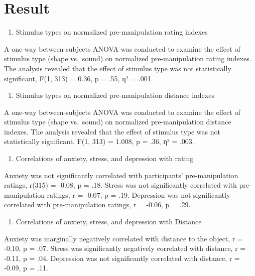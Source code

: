 \documentclass[
  letterpaper,
  DIV=11,
  numbers=noendperiod]{scrartcl}
\providecommand{\tightlist}{%
  \setlength{\itemsep}{0pt}\setlength{\parskip}{0pt}}\usepackage{longtable,booktabs,array}
\begin{document}
\section{Result}\label{result}

\begin{enumerate}
\def\labelenumi{\arabic{enumi}.}
\tightlist
\item
  Stimulus types on normalized pre-manipulation rating indexes
\end{enumerate}

A one-way between-subjects ANOVA was conducted to examine the effect of
stimulus type (shape vs.~sound) on normalized pre-manipulation rating
indexes. The analysis revealed that the effect of stimulus type was not
statistically significant, F(1, 313) = 0.36, p = .55, η² = .001.

\begin{enumerate}
\def\labelenumi{\arabic{enumi}.}
\setcounter{enumi}{1}
\tightlist
\item
  Stimulus types on normalized pre-manipulation distance indexes
\end{enumerate}

A one-way between-subjects ANOVA was conducted to examine the effect of
stimulus type (shape vs.~sound) on normalized pre-manipulation distance
indexes. The analysis revealed that the effect of stimulus type was not
statistically significant, F(1, 313) = 1.008, p = .36, η² = .003.

\begin{enumerate}
\def\labelenumi{\arabic{enumi}.}
\setcounter{enumi}{2}
\tightlist
\item
  Correlations of anxiety, stress, and depression with rating
\end{enumerate}

Anxiety was not significantly correlated with participants'
pre-manipulation ratings, r(315) = -0.08, p = .18. Stress was not
significantly correlated with pre-manipulation ratings, r = -0.07, p =
.19. Depression was not significantly correlated with pre-manipulation
ratings, r = -0.06, p = .29.

\begin{enumerate}
\def\labelenumi{\arabic{enumi}.}
\setcounter{enumi}{3}
\tightlist
\item
  Correlations of anxiety, stress, and depression with Distance
\end{enumerate}

Anxiety was marginally negatively correlated with distance to the
object, r = -0.10, p = .07. Stress was significantly negatively
correlated with distance, r = -0.11, p = .04. Depression was not
significantly correlated with distance, r = -0.09, p = .11.
\end{document}
